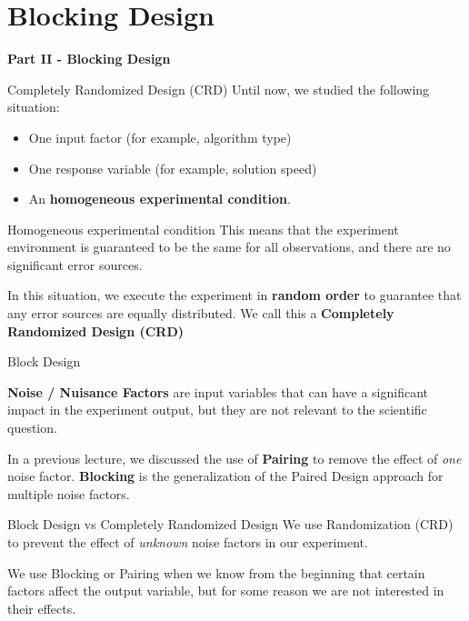 \section{Blocking Design}
\begin{frame}
  \begin{center}
    {\bf Part II - Blocking Design}
  \end{center}
\end{frame}

\begin{frame}{Completely Randomized Design (CRD)}
  Until now, we studied the following situation:
  \begin{itemize}
    \item One input factor (for example, algorithm type)
    \item One response variable (for example, solution speed)
    \item An {\bf homogeneous experimental condition}.
  \end{itemize}\bigskip

  \begin{block}{Homogeneous experimental condition}
    This means that the experiment environment is guaranteed to be the same
    for all observations, and there are no significant error sources.
  \end{block}\bigskip

  In this situation, we execute the experiment in {\bf random order} to
  guarantee that any error sources are equally distributed.
  We call this a {\bf Completely Randomized Design (CRD)}
\end{frame}

\begin{frame}{Block Design}

  {\bf Noise / Nuisance Factors} are input variables that can have a significant impact in
  the experiment output, but they are not relevant to the scientific question.\bigskip

  In a previous lecture, we discussed the use of {\bf Pairing} to remove the
  effect of \emph{one} noise factor. {\bf Blocking} is the generalization of the
  Paired Design approach for multiple noise factors.\bigskip

  \begin{block}{Block Design vs Completely Randomized Design}
    We use Randomization (CRD) to prevent the effect of \emph{unknown} noise factors in our experiment.
    \bigskip

    We use Blocking or Pairing when we know from the beginning that certain factors affect the output
    variable, but for some reason we are not interested in their effects.
  \end{block}
\end{frame}

